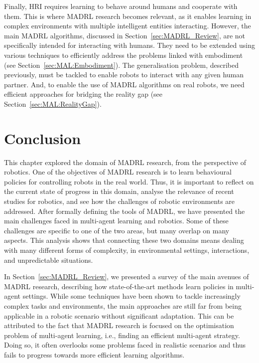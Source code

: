 Finally, HRI requires learning to behave around humans and cooperate with them. This is where MADRL research becomes relevant, as it enables learning in complex environments with multiple intelligent entities interacting. However, the main MADRL algorithms, discussed in Section~\ref{sec:MADRL_Review}, are not specifically intended for interacting with humans. They need to be extended using various techniques to efficiently address the problems linked with embodiment (see Section~\ref{sec:MAL:Embodiment}). The generalisation problem, described previously, must be tackled to enable robots to interact with any given human partner. And, to enable the use of MADRL algorithms on real robots, we need efficient approaches for bridging the reality gap (see Section~\ref{sec:MAL:RealityGap}). 






\section{Conclusion}\label{sec:MADRL_Conclusion}

This chapter explored the domain of MADRL research, from the perspective of robotics. One of the objectives of MADRL research is to learn behavioural policies for controlling robots in the real world. Thus, it is important to reflect on the current state of progress in this domain, analyse the relevance of recent studies for robotics, and see how the challenges of robotic environments are addressed. After formally defining the tools of MADRL, we have presented the main challenges faced in multi-agent learning and robotics. Some of these challenges are specific to one of the two areas, but many overlap on many aspects. This analysis shows that connecting these two domains means dealing with many different forms of complexity, in environmental settings, interactions, and unpredictable situations. 

In Section~\ref{sec:MADRL_Review}, we presented a survey of the main avenues of MADRL research, describing how state-of-the-art methods learn policies in multi-agent settings. While some techniques have been shown to tackle increasingly complex tasks and environments, the main approaches are still far from being applicable in a robotic scenario without significant adaptation. This can be attributed to the fact that MADRL research is focused on the optimisation problem of multi-agent learning, i.e., finding an efficient multi-agent strategy. Doing so, it often overlooks some problems faced in realistic scenarios and thus fails to progress towards more efficient learning algorithms. 

